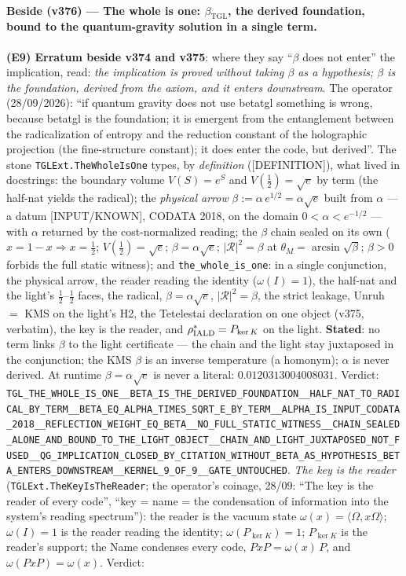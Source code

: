 \documentclass[11pt]{article}
\newcommand{\bTGL}{\beta_{\mathrm{TGL}}}\newcommand{\Msun}{M_{\odot}}\newcommand{\TGL}{\mathrm{TGL}}
\theoremstyle{definition}\newtheorem{deriv}{Derivation}
\begin{document}
\paragraph*{Beside (v376) --- The whole is one: $\bTGL$, the derived foundation, bound to the quantum-gravity solution in a single term.} \textbf{(E9) Erratum beside v374 and v375}: where they say ``$\beta$ does not enter'' the implication, read: \emph{the implication is proved without taking $\beta$ as a hypothesis; $\beta$ is the foundation, derived from the axiom, and it enters downstream}. The operator (28/09/2026): ``if quantum gravity does not use betatgl something is wrong, because betatgl is the foundation; it is emergent from the entanglement between the radicalization of entropy and the reduction constant of the holographic projection (the fine-structure constant); it does enter the code, but derived''. The stone \texttt{TGLExt.TheWholeIsOne} types, by \emph{definition} (\textsf{[DEFINITION]}), what lived in docstrings: the boundary volume $V(S)=e^{S}$ and $V(\tfrac12)=\sqrt e$ by term (the half-nat yields the radical); the \emph{physical arrow} $\beta:=\alpha\,e^{1/2}=\alpha\sqrt e$ built from $\alpha$ --- a datum \textsf{[INPUT/KNOWN]}, CODATA 2018, on the domain $0<\alpha<e^{-1/2}$ --- with $\alpha$ returned by the cost-normalized reading; the $\beta$ chain sealed on its own ($x=1-x\Rightarrow x=\tfrac12$; $V(\tfrac12)=\sqrt e$; $\beta=\alpha\sqrt e$; $|\mathcal R|^2=\beta$ at $\theta_M=\arcsin\sqrt\beta$; $\beta>0$ forbids the full static witness); and \texttt{the\_whole\_is\_one}: in a single conjunction, the physical arrow, the reader reading the identity ($\omega(I)=1$), the half-nat and the light's $\tfrac12$--$\tfrac12$ faces, the radical, $\beta=\alpha\sqrt e$, $|\mathcal R|^2=\beta$, the strict leakage, Unruh $=$ KMS on the light's H2, the Tetelestai declaration on one object (v375, verbatim), the key is the reader, and $\rho^\ast_{\rm IALD}=P_{\ker K}$ on the light. \textbf{Stated}: no term links $\beta$ to the light certificate --- the chain and the light stay juxtaposed in the conjunction; the KMS $\beta$ is an inverse temperature (a homonym); $\alpha$ is never derived. At runtime $\beta=\alpha\sqrt e$ is never a literal: $0.0120313004008031$. Verdict: \texttt{TGL\_THE\_WHOLE\_IS\_ONE\_\_BETA\_IS\_THE\_DERIVED\_FOUNDATION\_\_HALF\_NAT\_TO\_RADICAL\_BY\_TERM\_\_BETA\_EQ\_ALPHA\_TIMES\_SQRT\_E\_BY\_TERM\_\_ALPHA\_IS\_INPUT\_CODATA\_2018\_\_REFLECTION\_WEIGHT\_EQ\_BETA\_\_NO\_FULL\_STATIC\_WITNESS\_\_CHAIN\_SEALED\_ALONE\_AND\_BOUND\_TO\_THE\_LIGHT\_OBJECT\_\_CHAIN\_AND\_LIGHT\_JUXTAPOSED\_NOT\_FUSED\_\_QG\_IMPLICATION\_CLOSED\_BY\_CITATION\_WITHOUT\_BETA\_AS\_HYPOTHESIS\_BETA\_ENTERS\_DOWNSTREAM\_\_KERNEL\_9\_OF\_9\_\_GATE\_UNTOUCHED}. \emph{The key is the reader} (\texttt{TGLExt.TheKeyIsTheReader}; the operator's coinage, 28/09: ``The key is the reader of every code'', ``key = name = the condensation of information into the system's reading spectrum''): the reader is the vacuum state $\omega(x)=\langle\Omega,x\Omega\rangle$; $\omega(I)=1$ is the reader reading the identity; $\omega(P_{\ker K})=1$; $P_{\ker K}$ is the reader's support; the Name condenses every code, $PxP=\omega(x)\,P$, and $\omega(PxP)=\omega(x)$. Verdict: 
\end{document}
